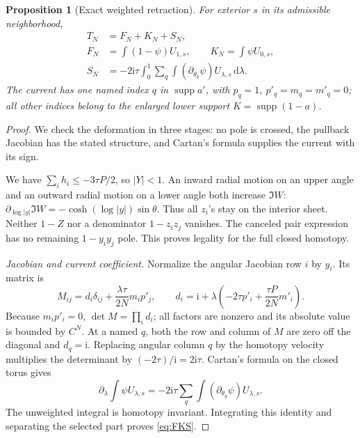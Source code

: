 \documentclass[11pt]{article}
\numberwithin{equation}{section}
\newtheorem{proposition}[theorem]{Proposition}
\theoremstyle{definition}
\newcommand{\dd}{\,\mathrm d}
\newcommand{\ii}{\mathrm i}
\begin{document}
\begin{proposition}[Exact weighted retraction]\label{prop:selector}
For exterior \(s\) in its admissible neighborhood,
\begin{align}
 T_N&=F_N+K_N+S_N,\label{eq:FKS}\\
 F_N&=\int(1-\psi)U_{1,s},\qquad K_N=\int\psi U_{0,s},\nonumber\\
 S_N&=-2\ii\tau\int_0^1\sum_q\int
                         (\partial_{\theta_q}\psi)U_{\lambda,s}\dd\lambda.
 \label{eq:current}
\end{align}
The current has one named index \(q\) in \(\operatorname{supp}a'\),
with \(p_q=1,\ p'_q=m_q=m'_q=0\); all other indices belong to
the enlarged lower support \(K=\operatorname{supp}(1-a)\).
\end{proposition}
\begin{proof}
We check the deformation in three stages: no pole is crossed, the pullback Jacobian has the stated structure, and Cartan's formula supplies the current with its sign.

We have \(\sum_i h_i\le-3\tau P/2\), so \(|Y|<1\).
An inward radial motion on an upper angle and an outward radial motion
on a lower angle both increase \(\Im W\):
\(\partial_{\log|y|}\Im W=-\cosh(\log|y|)\sin\theta\).
Thus all \(z_i\)'s stay on the interior sheet. Neither \(1-Z\)
nor a denominator \(1-z_iz_j\) vanishes. The canceled pair expression
has no remaining \(1-y_iy_j\) pole. This proves legality for the full
closed homotopy.

\smallskip\noindent\textit{Jacobian and current coefficient.}
Normalize the angular Jacobian row \(i\) by \(y_i\). Its matrix is
\[
 M_{ij}=d_i\delta_{ij}+\frac{\lambda\tau}{2N}m_i p'_j,\qquad
 d_i=\ii+\lambda\left(-2\tau p'_i+\frac{\tau P}{2N}m'_i\right).
\]
Because \(m_ip'_i=0\), \(\det M=\prod_i d_i\); all factors are
nonzero and its absolute value is bounded by \(C^N\).
At a named \(q\), both the row and column of \(M\) are zero
off the diagonal and \(d_q=\ii\). Replacing angular column \(q\)
by the homotopy velocity multiplies the determinant by
\((-2\tau)/\ii=2\ii\tau\).
Cartan's formula on the closed torus gives
\[
 \partial_\lambda\int\psi U_{\lambda,s}
 =-2\ii\tau\sum_q\int(\partial_{\theta_q}\psi)U_{\lambda,s}.
\]
The unweighted integral is homotopy invariant. Integrating this identity
and separating the selected part proves \eqref{eq:FKS}.
\end{proof}
\end{document}
